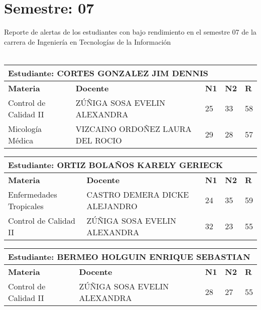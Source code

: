 \section{Semestre: 07}
        Reporte de alertas de los estudiantes con bajo rendimiento en el semestre 07 de la carrera de 
        Ingeniería en Tecnologías de la Información\\\\\small
\begin{tabularx}{\textwidth}{|p{5cm}|p{7cm}|X|X|X|}
\hline
\multicolumn{5}{|p{\dimexpr\textwidth-2\tabcolsep-2\arrayrulewidth}|}{\textbf{Estudiante: CORTES GONZALEZ JIM DENNIS }}\\\hline
\textbf{Materia} & \textbf{Docente} & \textbf{N1} & \textbf{N2} & \textbf{R} \\ \hline
Control de Calidad II & ZÚÑIGA SOSA EVELIN ALEXANDRA  & 25 & 33& 58 \\ \hline
Micología Médica & VIZCAINO ORDOÑEZ LAURA DEL ROCIO   & 29 & 28& 57 \\ \hline
\end{tabularx}\vspace{10mm}
\small
\begin{tabularx}{\textwidth}{|p{5cm}|p{7cm}|X|X|X|}
\hline
\multicolumn{5}{|p{\dimexpr\textwidth-2\tabcolsep-2\arrayrulewidth}|}{\textbf{Estudiante: ORTIZ BOLAÑOS KARELY GERIECK }}\\\hline
\textbf{Materia} & \textbf{Docente} & \textbf{N1} & \textbf{N2} & \textbf{R} \\ \hline
Enfermedades Tropicales & CASTRO DEMERA DICKE ALEJANDRO  & 24 & 35& 59 \\ \hline
Control de Calidad II & ZÚÑIGA SOSA EVELIN ALEXANDRA  & 32 & 23& 55 \\ \hline
\end{tabularx}\vspace{10mm}
\small
\begin{tabularx}{\textwidth}{|p{5cm}|p{7cm}|X|X|X|}
\hline
\multicolumn{5}{|p{\dimexpr\textwidth-2\tabcolsep-2\arrayrulewidth}|}{\textbf{Estudiante: BERMEO HOLGUIN ENRIQUE SEBASTIAN }}\\\hline
\textbf{Materia} & \textbf{Docente} & \textbf{N1} & \textbf{N2} & \textbf{R} \\ \hline
Control de Calidad II & ZÚÑIGA SOSA EVELIN ALEXANDRA  & 28 & 27& 55 \\ \hline
\end{tabularx}\vspace{10mm}
\small
